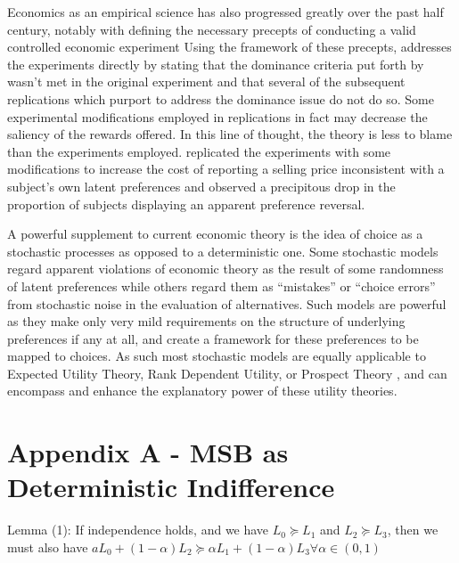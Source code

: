 \documentclass[../main.tex]{subfiles}
\begin{document}
Economics as an empirical science has also progressed greatly over the past half century, notably with \textcite{Smith1982} defining the necessary precepts of conducting a valid controlled economic experiment
Using the framework of these precepts, \textcite{Harrison1994} addresses the \textcite{Grether1979} experiments directly by stating that the dominance criteria put forth by \textcite{Smith1982} wasn't met in the original experiment and that several of the subsequent replications which purport to address the dominance issue do not do so.
Some experimental modifications employed in replications in fact may decrease the saliency of the rewards offered.
In this line of thought, the theory is less to blame than the experiments employed.
\textcite[236-239]{Harrison1994} replicated the\textcite{Grether1979} experiments with some modifications to increase the cost of reporting a selling price inconsistent with a subject's own latent preferences and observed a precipitous drop in the proportion of subjects displaying an apparent preference reversal.

A powerful supplement to current economic theory is the idea of choice as a stochastic processes as opposed to a deterministic one.
Some stochastic models regard apparent violations of economic theory as the result of some randomness of latent preferences while others regard them as \enquote{mistakes} or \enquote{choice errors} from stochastic noise in the evaluation of alternatives.
Such models are powerful as they make only very mild requirements on the structure of underlying preferences if any at all, and create a framework for these preferences to be mapped to choices.
As such most stochastic models are equally applicable to Expected Utility Theory, Rank Dependent Utility, or Prospect Theory \parencite{Kahneman1979, Tversky1992}, and can encompass and enhance the explanatory power of these utility theories.

\break

\section{Appendix A - MSB as Deterministic Indifference}

Lemma (1): If independence holds, and we have $L_0 \succeq L_1$ and $L_2 \succeq L_3$, then we must also have $aL_0 + (1-\alpha)L_2 \succeq \alpha L_1 + (1 - \alpha) L_3 \forall \alpha \in (0,1)$
\end{document}
